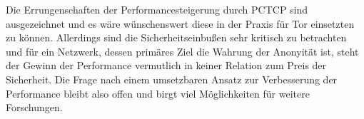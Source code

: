 \documentclass[fleqn,envcountsame,runningheads,10pt,a4paper]{llncs}
\begin{document}
Die Errungenschaften der Performancesteigerung durch PCTCP sind ausgezeichnet 
und es wäre wünschenswert diese in der Praxis für Tor einsetzten zu können. 
Allerdings sind die Sicherheitseinbußen sehr kritisch zu betrachten und für ein 
Netzwerk, dessen primäres Ziel die Wahrung der Anonyität ist, steht der Gewinn 
der Performance vermutlich in keiner Relation zum Preis der Sicherheit. Die 
Frage nach einem umsetzbaren Ansatz zur Verbesserung der Performance bleibt also 
offen und birgt viel Möglichkeiten für weitere Forschungen.



\end{document}
